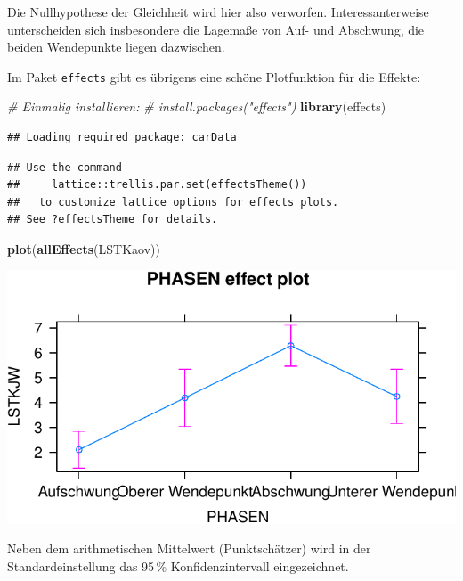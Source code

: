 \documentclass[12pt,ngerman,paper=a4,pagesize,DIV=13]{scrreprt}
\newenvironment{Shaded}{\begin{snugshade}}{\end{snugshade}}
\newcommand{\CommentTok}[1]{\textcolor[rgb]{0.56,0.35,0.01}{\textit{#1}}}
\newcommand{\KeywordTok}[1]{\textcolor[rgb]{0.13,0.29,0.53}{\textbf{#1}}}
\newcommand{\NormalTok}[1]{#1}
\begin{document}
Die Nullhypothese der Gleichheit wird hier also verworfen.
Interessanterweise unterscheiden sich insbesondere die Lagemaße von Auf-
und Abschwung, die beiden Wendepunkte liegen dazwischen.

Im Paket \texttt{effects} gibt es übrigens eine schöne Plotfunktion für
die Effekte:

\begin{Shaded}
\begin{Highlighting}[]
\CommentTok{# Einmalig installieren:}
\CommentTok{# install.packages("effects")}
\KeywordTok{library}\NormalTok{(effects)}
\end{Highlighting}
\end{Shaded}

\begin{verbatim}
## Loading required package: carData
\end{verbatim}

\begin{verbatim}
## Use the command
##     lattice::trellis.par.set(effectsTheme())
##   to customize lattice options for effects plots.
## See ?effectsTheme for details.
\end{verbatim}

\begin{Shaded}
\begin{Highlighting}[]
\KeywordTok{plot}\NormalTok{(}\KeywordTok{allEffects}\NormalTok{(LSTKaov))}
\end{Highlighting}
\end{Shaded}

\includegraphics{DatenerhebungStatistik-Uebung_files/figure-latex/unnamed-chunk-151-1.pdf}

Neben dem arithmetischen Mittelwert (Punktschätzer) wird in der
Standardeinstellung das 95\(\,\)\% Konfidenzintervall eingezeichnet.
\end{document}
